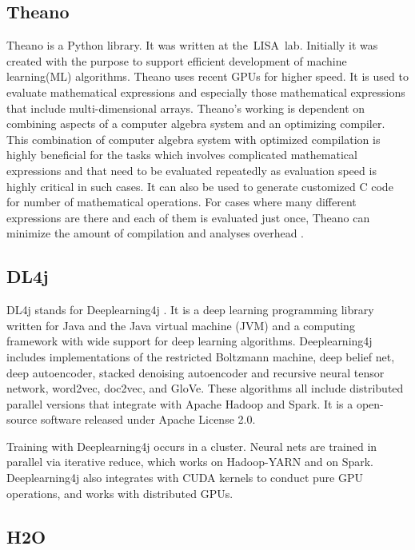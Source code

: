     
\subsection{Theano}
    
    Theano is a Python library. It was written at the LISA lab.
    Initially it was created with the purpose to support efficient
    development of machine learning(ML) algorithms.  Theano uses
    recent GPUs for higher speed.  It is used to evaluate mathematical
    expressions and especially those mathematical expressions that
    include multi-dimensional arrays.  Theano’s working is dependent
    on combining aspects of a computer algebra system and an
    optimizing compiler.  This combination of computer algebra system
    with optimized compilation is highly beneficial for the tasks
    which involves complicated mathematical expressions and that need
    to be evaluated repeatedly as evaluation speed is highly critical
    in such cases.  It can also be used to generate customized C code
    for number of mathematical operations.  For cases where many
    different expressions are there and each of them is evaluated just
    once, Theano can minimize the amount of compilation and analyses
    overhead \cite{www-theano}.
    
\subsection{DL4j}

    DL4j stands for Deeplearning4j \cite{www-dl4j}. It is a deep
    learning programming library written for Java and the Java virtual
    machine (JVM) and a computing framework with wide support for deep
    learning algorithms. Deeplearning4j includes implementations of
    the restricted Boltzmann machine, deep belief net, deep
    autoencoder, stacked denoising autoencoder and recursive neural
    tensor network, word2vec, doc2vec, and GloVe. These algorithms all
    include distributed parallel versions that integrate with Apache
    Hadoop and Spark. It is a open-source software released under
    Apache License 2.0.

    Training with Deeplearning4j occurs in a cluster. Neural nets are
    trained in parallel via iterative reduce, which works on
    Hadoop-YARN and on Spark. Deeplearning4j also integrates with CUDA
    kernels to conduct pure GPU operations, and works with distributed
    GPUs.
	
\subsection{H2O}

